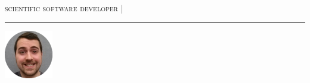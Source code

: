 \thispagestyle{frontpage}
\begin{minipage}[b]{0.8\textwidth}
    \begin{flushleft}
        \fontsize{24}{20} \selectfont \textsc{\myname{}} \\
        \fontsize{12}{14} \textsc{scientific software developer |}
        {\normalsize \myemail{}}
    \end{flushleft}
    \textcolor{gray}{\rule{\textwidth}{0.1mm}}
\end{minipage}
\begin{minipage}[b]{0.2\textwidth}
   \begin{flushright}
       \includegraphics[width=80px]{images/headshot-circle}
   \end{flushright}
\end{minipage}

